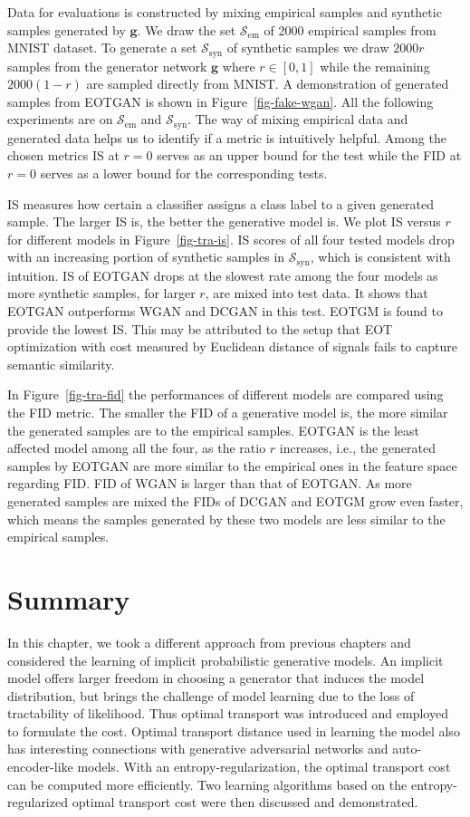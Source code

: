 Data for evaluations is constructed by mixing empirical samples and
synthetic samples generated by $\bm{g}$. We draw the set $\mathcal{S}_{\mathrm{em}}$ of 2000 empirical samples from MNIST dataset. To generate a set $\mathcal{S}_{\mathrm{syn}}$ of synthetic
samples we draw $2000r$ samples from the generator network $\bm{g}$ where
$r\in[0,1]$ while the remaining $2000(1-r)$ are sampled directly from
MNIST. A demonstration of generated samples from EOTGAN is shown in Figure~\ref{fig-fake-wgan}.
All the following experiments are on
$\mathcal{S}_{\mathrm{em}}$ and $\mathcal{S}_{\mathrm{syn}}$. 
The way of mixing empirical data and generated data helps
us to identify if a metric is intuitively helpful. Among the chosen metrics IS at $r=0$ serves as an upper bound for the test while the FID at $r=0$ serves as a lower bound for the corresponding tests. 

IS measures how certain a classifier assigns a class label to a given
generated sample. The larger IS is, the better the generative model
is. We plot IS versus $r$ for different models in
Figure~\ref{fig-tra-is}. IS scores of all four tested models drop with
an increasing portion of synthetic samples in
$\mathcal{S}_{\mathrm{syn}}$, which is consistent with intuition. IS
of EOTGAN drops at the slowest rate among the four models as more
synthetic samples, for larger $r$, are mixed into test data. It shows
that EOTGAN outperforms WGAN and DCGAN in this test. EOTGM is found to provide the lowest IS.
This may be attributed to the setup that 
EOT optimization with cost measured by Euclidean distance of signals
fails to capture semantic similarity.

In Figure~\ref{fig-tra-fid} the performances of different models are
compared using the FID metric. The smaller the FID of a generative model is, the more similar the
generated samples are to the empirical samples. EOTGAN is the least affected model among all the four, as the ratio $r$ increases, i.e., the generated samples by EOTGAN are more similar to the empirical
ones in the feature space regarding FID. FID of WGAN is larger than that of EOTGAN. As
more generated samples are mixed the FIDs of DCGAN and EOTGM grow
even faster, which means the samples generated by these two models are
less similar to the empirical samples.

\section{Summary}
In this chapter, we took a different approach from previous chapters and considered the learning of implicit probabilistic generative models. An implicit model offers larger freedom in choosing a generator that induces the model distribution, but brings the challenge of model learning due to the loss of tractability of likelihood. Thus optimal transport was introduced and employed to formulate the cost. Optimal transport distance used in learning the model also has interesting connections with generative adversarial networks and auto-encoder-like models. With an entropy-regularization, the optimal transport cost can be computed more efficiently. Two learning algorithms based on the entropy-regularized optimal transport cost were then discussed and demonstrated. 

